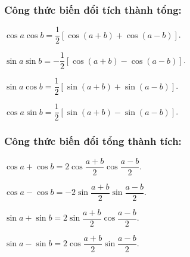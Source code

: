 \subsubsection{Công thức biến đổi tích thành tổng:}
\begin{gachsoc}
	\begin{listEX}[2]
		\item [\ding{172}] $\cos a\cos b=\dfrac{1}{2}\left[{\cos \left({a+b}\right)+\cos \left({a-b}\right)}\right]$.
		\item [\ding{173}] $\sin a\sin b=-\dfrac{1}{2}\left[{\cos\left({a+b}\right)-\cos\left({a-b}\right)}\right]$.
		\item [\ding{174}] $\sin a\cos b=\dfrac{1}{2}\left[{\sin\left({a+b}\right)+\sin\left({a-b}\right)}\right]$.
		\item [\ding{175}] $\cos a\sin b=\dfrac{1}{2}\left[{\sin\left({a+b}\right)-\sin\left({a-b}\right)}\right]$.
	\end{listEX}
\end{gachsoc}

\subsubsection{Công thức biến đổi tổng thành tích:}
\begin{gachsoc}
	\begin{listEX}[2]
		\item [\ding{172}] $\cos a+\cos b=2\cos \dfrac{{a+b}}{2}\cos \dfrac{{a-b}}{2}$.
		\item [\ding{173}] $\cos a-\cos b=-2\sin\dfrac{{a+b}}{2}\sin\dfrac{{a-b}}{2}$.
		\item [\ding{174}] $\sin a+\sin b=2\sin \dfrac{{a+b}}{2}\cos \dfrac{{a-b}}{2}$.
		\item [\ding{175}] $\sin a-\sin b=2\cos\dfrac{{a+b}}{2}\sin\dfrac{{a-b}}{2}$.
	\end{listEX}
\end{gachsoc}